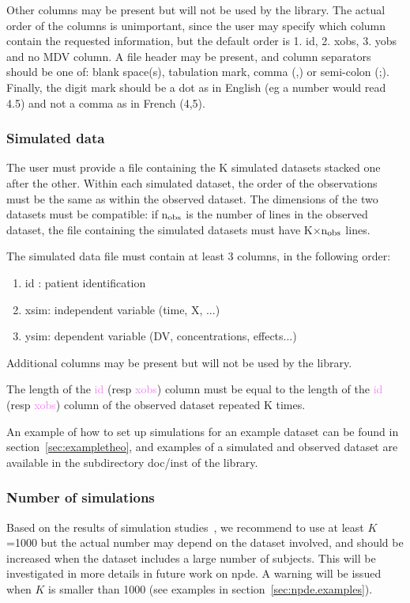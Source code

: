 Other columns may be present but will not be used by the library. The actual order of the columns is unimportant, 
since the user may specify which column contain the requested information, but the default order is 1. id, 2. xobs, 
3. yobs and no MDV column. A file header may be present, and column separators should be one of: blank space(s), 
tabulation mark, comma (,) or semi-colon (;). Finally, the digit mark should be a dot as in English (eg a number 
would read 4.5) and not a comma as in French (4,5).

\subsubsection{Simulated data}

\hskip 18pt The user must provide a file containing the K simulated datasets stacked one after the other. Within 
each simulated dataset, the order of the observations must be the same as within the observed dataset. The 
dimensions of the two datasets must be compatible: if n$_{\rm obs}$ is the number of lines in the observed dataset, 
the file containing the simulated datasets must have K$\times$n$_{\rm obs}$ lines.

The simulated data file must contain at least 3 columns, in the following order: \begin{enumerate} \item id : 
patient identification \item xsim: independent variable (time, X, ...) \item ysim: dependent variable (DV, 
concentrations, effects...) \end{enumerate} Additional columns may be present but will not be used by the library.

The length of the \textcolor{violet}{id} (resp \textcolor{violet}{xobs}) column must be equal to the length of the 
\textcolor{violet}{id} (resp \textcolor{violet}{xobs}) column of the observed dataset repeated K times.

An example of how to set up simulations for an example dataset can be found in section~\ref{sec:exampletheo}, and 
examples of a simulated and observed dataset are available in the subdirectory {\sf doc/inst} of the library.

\subsubsection{Number of simulations}

\hskip 18pt Based on the results of simulation studies~\cite{Brendel10,Comets10}, we recommend to use at least 
$K$=1000 but the actual number may depend on the dataset involved, and should be increased when the dataset 
includes a large number of subjects. This will be investigated in more details in future work on {\sf npde}. A 
warning will be issued when $K$ is smaller than 1000 (see examples in section~\ref{sec:npde.examples}).

